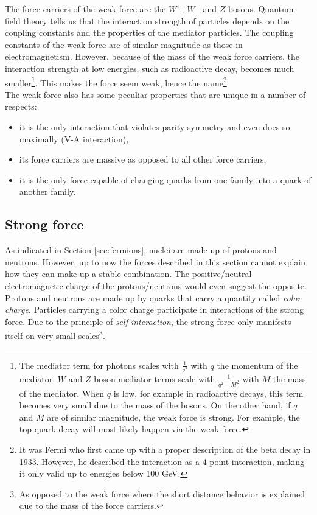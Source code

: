 The force carriers of the weak force are the $W^+$, $W^-$ and $Z$ bosons. 
Quantum field theory tells us that the interaction strength of particles depends on the coupling constants and the properties of the mediator particles. The coupling constants of the weak force are of similar magnitude as those in electromagnetism. However, because of the mass of the weak force carriers, the interaction strength at low energies, such as radioactive decay, becomes much smaller\footnote{The mediator term for photons scales with $\frac{1}{q^2}$ with  $q$ the momentum of the mediator. $W$ and $Z$ boson mediator terms scale with $\frac{1}{q^2 - M^2}$ with $M$ the mass of the mediator. When $q$ is low, for example in radioactive decays, this term becomes very small due to the mass of the bosons. On the other hand, if $q$ and $M$ are of similar magnitude, the weak force is strong. For example, the top quark decay will most likely happen via the weak force.}. This makes the force seem weak, hence the name\footnote{It was Fermi who first came up with a proper description of the beta decay in 1933. However, he described the interaction as a 4-point interaction, making it only valid up to energies below 100 GeV.}.\\

\noindent The weak force also has some peculiar properties that are unique in a number of respects:

\vspace{2mm}
\begin{itemize}
\item it is the only interaction that violates parity symmetry and even does so maximally (V-A interaction),
\item its force carriers are massive as opposed to all other force carriers,
\item it is the only force capable of changing quarks from one family into a quark of another family.
\end{itemize}

\subsection{Strong force}
\label{subsec:strong}
As indicated in Section \ref{sec:fermions}, nuclei are made up of protons and neutrons. However, up to now the forces described in this section cannot explain how they can make up a stable combination. The positive/neutral electromagnetic charge of the protons/neutrons would even suggest the opposite. Protons and neutrons are made up by quarks that carry a quantity called \textit{color charge}. Particles carrying a color charge participate in interactions of the strong force. Due to the principle of \textit{self interaction}, the strong force only manifests itself on very small scales\footnote{As opposed to the weak force where the short distance behavior is explained due to the mass of the force carriers.}.

